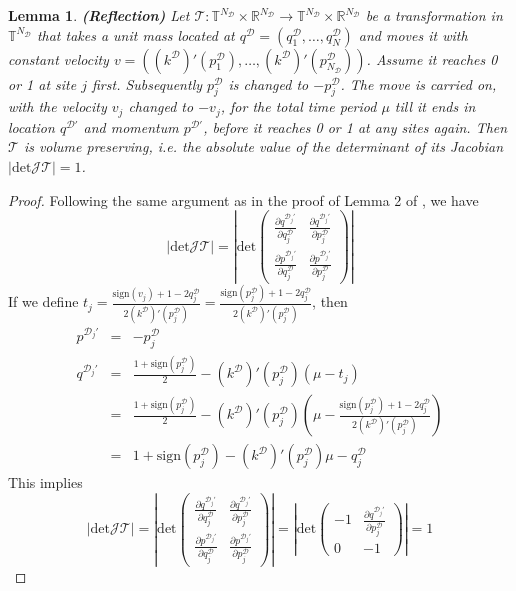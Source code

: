 \documentclass{article}
\newcommand{\cald}{\mathcal{D}}
\newtheorem{lemma}{Lemma}
\begin{document}
\begin{lemma}\label{lem:reflection}  {\textbf{(Reflection)}}
    Let $\mathcal{T} : \mathbb{T}^{N_\cald} \times \mathbb{R}^{N_\cald} \rightarrow \mathbb{T}^{N_\cald} \times \mathbb{R}^{N_\cald}$ be a transformation in $\mathbb{T}^{N_\cald}$ that takes a unit mass located at $q^\cald = (q^\cald_1, \ldots, q^\cald_N)$ and moves it with constant velocity $v = ((k^\cald)' (p^\cald_1), \ldots, (k^\cald)' (p^\cald_{N_\cald}))$. Assume it reaches 0 or 1 at site $j$ first. Subsequently $p^\cald_j$ is changed to $- p^\cald_j$. The move is carried on, with the velocity $v_j$ changed to $-v_j$, for the total time period $\mu$ till it ends in location $q^{\cald\prime}$ and momentum $p^{\cald\prime}$, before it reaches 0 or 1 at any sites again. Then $\mathcal{T}$ is volume preserving, i.e. the absolute value of the determinant of its Jacobian $| \text{det}\mathcal{J} \mathcal{T} | = 1$.
\end{lemma}

\begin{proof}
Following the same argument as in the proof of Lemma 2 of \cite{Mohasel_Afshar2015-uh}, we have
\[ | \text{det}\mathcal{J} \mathcal{T} | = \left| \text{det}\left(\begin{array}{cc}
        \frac{\partial q^{\cald_j\prime}}{\partial q^\cald_j} & \frac{\partial q^{\cald_j\prime}}{\partial p^\cald_j}\\
        \frac{\partial p^{\cald_j\prime}}{\partial q^\cald_j} & \frac{\partial p^{\cald_j\prime}}{\partial p^\cald_j}
   \end{array}\right) \right| \]
   If we define $t_j = \frac{\text{sign} (v_j) + 1 - 2 q^\cald_j}{2 (k^\cald)' (p^\cald_j)} = \frac{\text{sign} (p^\cald_j) + 1 - 2 q^\cald_j}{2 (k^\cald)' (p^\cald_j)}$, then
\begin{eqnarray*}
    p^{\cald_j\prime} & = & - p^\cald_j\\
    q^{\cald_j\prime} & = & \frac{1 + \text{sign}(p^\cald_j)}{2} - (k^\cald)' (p^\cald_j) (\mu - t_j)\\
  & = & \frac{1 + \text{sign}(p^\cald_j)}{2} - (k^\cald)' (p^\cald_j) \left( \mu - \frac{\text{sign} (p^\cald_j) + 1 - 2 q^\cald_j}{2 (k^\cald)' (p^\cald_j)} \right)\\
  & = & 1 + \text{sign}(p^\cald_j) - (k^\cald)' (p^\cald_j) \mu - q^\cald_j
\end{eqnarray*}
This implies
\[ | \text{det}\mathcal{J} \mathcal{T} | = \left| \text{det}\left(\begin{array}{cc}
        \frac{\partial q^{\cald_j\prime}}{\partial q^\cald_j} & \frac{\partial q^{\cald_j\prime}}{\partial p^\cald_j}\\
        \frac{\partial p^{\cald_j\prime}}{\partial q^\cald_j} & \frac{\partial p^{\cald_j\prime}}{\partial p^\cald_j}
			\end{array}\right) \right| = \left| \text{det} \left(\begin{array}{cc}
        -1 & \frac{\partial q^{\cald_j\prime}}{\partial p^\cald_j}\\
     0 & - 1
   \end{array}\right) \right| = 1 \]
\end{proof}
\end{document}
